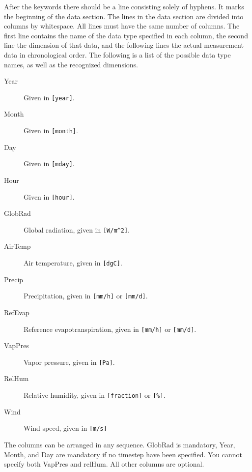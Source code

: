 After the keywords there should be a line consisting solely of
hyphens.  It marks the beginning of the data section.  The lines in
the data section are divided into columns by whitespace.  All lines
must have the same number of columns.  The first line contains the
name of the data type specified in each column, the second line the
dimension of that data, and the following lines the actual measurement
data in chronological order.  The following is a list of the possible
data type names, as well as the recognized dimensions.
\begin{description}
\item[Year] Given in \texttt{[year]}.
\item[Month] Given in \texttt{[month]}.
\item[Day] Given in \texttt{[mday]}.
\item[Hour] Given in \texttt{[hour]}.
\item[GlobRad] Global radiation, given in \verb|[W/m^2]|.
\item[AirTemp] Air temperature, given in \texttt{[dgC]}.
\item[Precip] Precipitation, given in \texttt{[mm/h]} or \texttt{[mm/d]}.
\item[RefEvap] Reference evapotranspiration, given in \texttt{[mm/h]}
  or \texttt{[mm/d]}.
\item[VapPres] Vapor pressure, given in \texttt{[Pa]}.
\item[RelHum] Relative humidity, given in \texttt{[fraction]} or
  \texttt{[\%]}. 
\item[Wind] Wind speed, given in \texttt{[m/s]}
\end{description}
The columns can be arranged in any sequence.  GlobRad is mandatory,
Year, Month, and Day are mandatory if no timestep have been
specified.  You cannot specify both VapPres and relHum.  All other
columns are optional. 



